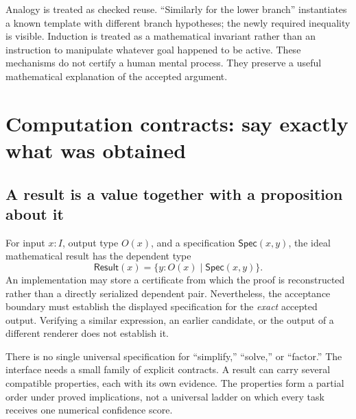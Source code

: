 \documentclass[11pt,a4paper]{article}
\newcommand{\Spec}{\mathsf{Spec}}
\theoremstyle{remark}
\begin{document}
Analogy is treated as checked reuse. ``Similarly for the lower branch'' instantiates
a known template with different branch hypotheses; the newly required inequality
is visible. Induction is treated as a mathematical invariant rather than an
instruction to manipulate whatever goal happened to be active. These mechanisms
do not certify a human mental process. They preserve a useful mathematical
explanation of the accepted argument.

\section{Computation contracts: say exactly what was obtained}
\label{sec:contracts}
\subsection{A result is a value together with a proposition about it}
For input $x:I$, output type $O(x)$, and a specification
$\Spec(x,y)$, the ideal mathematical result has the dependent type
\[
 \mathsf{Result}(x)=\{y:O(x)\mid\Spec(x,y)\}.
\]
An implementation may store a certificate from which the proof is reconstructed
rather than a directly serialized dependent pair. Nevertheless, the acceptance
boundary must establish the displayed specification for the \emph{exact} accepted
output. Verifying a similar expression, an earlier candidate, or the output of
a different renderer does not establish it.

There is no single universal specification for ``simplify,'' ``solve,'' or
``factor.'' The interface needs a small family of explicit contracts. A result
can carry several compatible properties, each with its own evidence. The
properties form a partial order under proved implications, not a universal ladder
on which every task receives one numerical confidence score.
\end{document}
